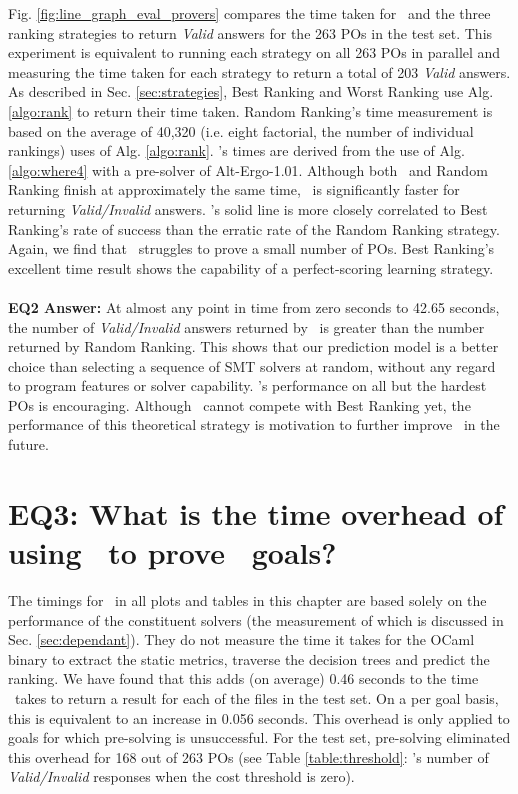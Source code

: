 Fig. \ref{fig:line_graph_eval_provers} compares the time taken for \where~and the three ranking strategies to return \textit{Valid} answers for the 263 POs in the test set.
This experiment is equivalent to running each strategy on all 263 POs in parallel and measuring the time taken for each strategy to return a total of 203 \textit{Valid} answers.
As described in Sec. \ref{sec:strategies}, \textsf{Best Ranking} and \textsf{Worst Ranking} use Alg. \ref{algo:rank} to return their time taken.
\textsf{Random Ranking}'s time measurement is based on the average of 40,320 (i.e. eight factorial, the number of individual rankings) uses of Alg. \ref{algo:rank}.
\where's times are derived from the use of Alg. \ref{algo:where4} with a pre-solver of Alt-Ergo-1.01. 
Although both \where~and \textsf{Random Ranking} finish at approximately the same time, \where~is significantly faster for returning \textit{Valid/Invalid} answers. 
\where's solid line is more closely correlated to \textsf{Best Ranking}'s rate of success than the erratic rate of the \textsf{Random Ranking} strategy. 
Again, we find that \where~struggles to prove a small number of POs.
\textsf{Best Ranking}'s excellent time result shows the capability of a perfect-scoring learning strategy. \\
\\
\textbf{EQ2 Answer:} At almost any point in time from zero seconds to 42.65 seconds, the number of \textit{Valid/Invalid} answers returned by \where~is greater than the number returned by \textsf{Random Ranking}.
This shows that our prediction model is a better choice than selecting a sequence of SMT solvers at random, without any regard to program features or solver capability.
\where's performance on all but the hardest POs is encouraging.
Although \where~cannot compete with \textsf{Best Ranking} yet, the performance of this theoretical strategy is motivation to further improve \where~in the future.   



\section{EQ3: What is the time overhead of using \where~to prove \why~goals?}

\label{sec:eq3}

The timings for \where~in all plots and tables in this chapter are based solely on the performance of the constituent solvers (the measurement of which is discussed in Sec. \ref{sec:dependant}). They do not measure the time it takes for the OCaml binary to extract the static metrics, traverse the decision trees and predict the ranking. 
We have found that this adds (on average) 0.46 seconds to the time \where~takes to return a result for each of the files in the test set. 
On a per goal basis, this is equivalent to an increase in 0.056 seconds.
This overhead is only applied to goals for which pre-solving is unsuccessful.  
For the test set, pre-solving eliminated this overhead for 168 out of 263 POs (see Table \ref{table:threshold}: \where's number of \textit{Valid/Invalid} responses when the cost threshold is zero).

